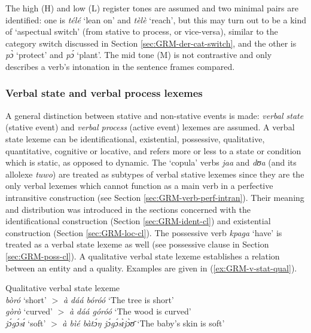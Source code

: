 \begin{exe}
\begin{exe}
\begin{exe}
{\begin{exe}
\begin{exe}
\begin{exe}
\begin{exe}
\begin{exe}
\begin{exe}
\begin{exe}
\begin{xlist}
\begin{exe}
\begin{exe}
\begin{exe}
\begin{exe}
\begin{exe}
\begin{exe}
\begin{exe}
\begin{exe}
\begin{exe}
\begin{exe}
\begin{exe}
\begin{exe}
\begin{exe}
 The high (H) and low (L) register tones are assumed and two minimal pairs are 
identified:  one is {\it télé} `lean on' and {\it tèlè} `reach', but this 
may turn out to be a kind of  `aspectual switch' (from stative to process, or 
vice-versa), similar to the category switch discussed in Section 
\ref{sec:GRM-der-cat-switch}, and the other is {\it pɔ̀} `protect' and  {\it 
pɔ́} `plant'.  The mid tone (M)  is not contrastive and only describes a verb's 
intonation in the sentence frames compared.
 

\subsubsection{Verbal state and verbal process lexemes}
\label{sec:GRM-verb-stative-active}

A general distinction
between stative and non-stative events  is made: {\it verbal state} (stative
event) and {\it verbal process} (active event) 
lexemes are assumed. A verbal state lexeme can be identificational,
existential, possessive,  qualitative, quantitative, cognitive or  locative, and
refers more or less to a state or condition which is static, as opposed to
dynamic. The `copula' verbs {\it jaa} and {\it dʊa} (and its allolexe {\it 
tuwo})
are treated as subtypes of verbal stative lexemes since they are the only verbal
lexemes which cannot function as a main verb in  a perfective intransitive
construction (see Section \ref{sec:GRM-verb-perf-intran}). Their meaning and
distribution was introduced in the sections concerned with the identificational
construction (Section \ref{sec:GRM-ident-cl}) and existential construction
(Section \ref{sec:GRM-loc-cl}).  The possessive verb
{\it kpaga} `have'  is treated as  a verbal state lexeme as well (see possessive
clause in Section   \ref{sec:GRM-poss-cl}).  A qualitative verbal state lexeme
establishes a relation between an entity and a quality. Examples are given in
(\ref{ex:GRM-v-stat-qual}).


\ea\label{ex:GRM-v-stat-qual}{\rm Qualitative verbal state lexeme}\\
 {\it bòró}  `short'  $>$ {\it à dáá bóróó} `The tree is short'\\
{\it gòrò}    `curved'  $>$ {\it à dáá góróó} `The wood is curved'\\
{\it jɔ́gɔ́sɪ́}    `soft'   $>$ {\it   à bìé bàtɔ́ŋ jɔ́gɔ́sɪ̀jɔ̀ʊ̄}  `The 
baby's
skin is soft'
\z


\end{exe}
\end{exe}
\end{exe}
\end{exe}
\end{exe}
\end{exe}
\end{exe}
\end{exe}
\end{exe}
\end{exe}
\end{exe}
\end{exe}
\end{exe}
\end{xlist}
\end{exe}
\end{exe}
\end{exe}
\end{exe}
\end{exe}
\end{exe}
\end{exe}}
\end{exe}
\end{exe}
\end{exe}
